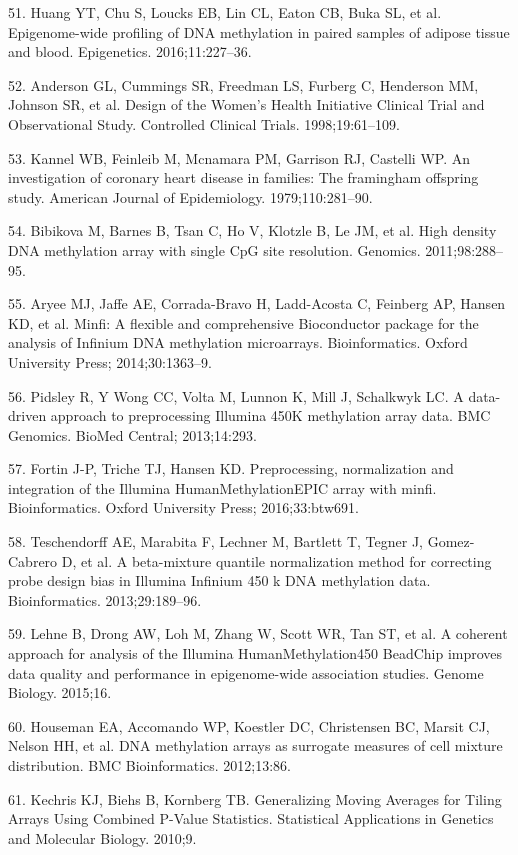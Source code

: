\documentclass[]{bmcart}
\begin{document}
51. Huang YT, Chu S, Loucks EB, Lin CL, Eaton CB, Buka SL, et al.
Epigenome-wide profiling of DNA methylation in paired samples of adipose
tissue and blood. Epigenetics. 2016;11:227--36.

52. Anderson GL, Cummings SR, Freedman LS, Furberg C, Henderson MM,
Johnson SR, et al. Design of the Women's Health Initiative Clinical
Trial and Observational Study. Controlled Clinical Trials.
1998;19:61--109.

53. Kannel WB, Feinleib M, Mcnamara PM, Garrison RJ, Castelli WP. An
investigation of coronary heart disease in families: The framingham
offspring study. American Journal of Epidemiology. 1979;110:281--90.

54. Bibikova M, Barnes B, Tsan C, Ho V, Klotzle B, Le JM, et al. High
density DNA methylation array with single CpG site resolution. Genomics.
2011;98:288--95.

55. Aryee MJ, Jaffe AE, Corrada-Bravo H, Ladd-Acosta C, Feinberg AP,
Hansen KD, et al. Minfi: A flexible and comprehensive Bioconductor
package for the analysis of Infinium DNA methylation microarrays.
Bioinformatics. Oxford University Press; 2014;30:1363--9.

56. Pidsley R, {Y Wong} CC, Volta M, Lunnon K, Mill J, Schalkwyk LC. A
data-driven approach to preprocessing Illumina 450K methylation array
data. BMC Genomics. BioMed Central; 2013;14:293.

57. Fortin J-P, Triche TJ, Hansen KD. Preprocessing, normalization and
integration of the Illumina HumanMethylationEPIC array with minfi.
Bioinformatics. Oxford University Press; 2016;33:btw691.

58. Teschendorff AE, Marabita F, Lechner M, Bartlett T, Tegner J,
Gomez-Cabrero D, et al. A beta-mixture quantile normalization method for
correcting probe design bias in Illumina Infinium 450 k DNA methylation
data. Bioinformatics. 2013;29:189--96.

59. Lehne B, Drong AW, Loh M, Zhang W, Scott WR, Tan ST, et al. A
coherent approach for analysis of the Illumina HumanMethylation450
BeadChip improves data quality and performance in epigenome-wide
association studies. Genome Biology. 2015;16.

60. Houseman EA, Accomando WP, Koestler DC, Christensen BC, Marsit CJ,
Nelson HH, et al. DNA methylation arrays as surrogate measures of cell
mixture distribution. BMC Bioinformatics. 2012;13:86.

61. Kechris KJ, Biehs B, Kornberg TB. Generalizing Moving Averages for
Tiling Arrays Using Combined P-Value Statistics. Statistical
Applications in Genetics and Molecular Biology. 2010;9.
\end{document}
